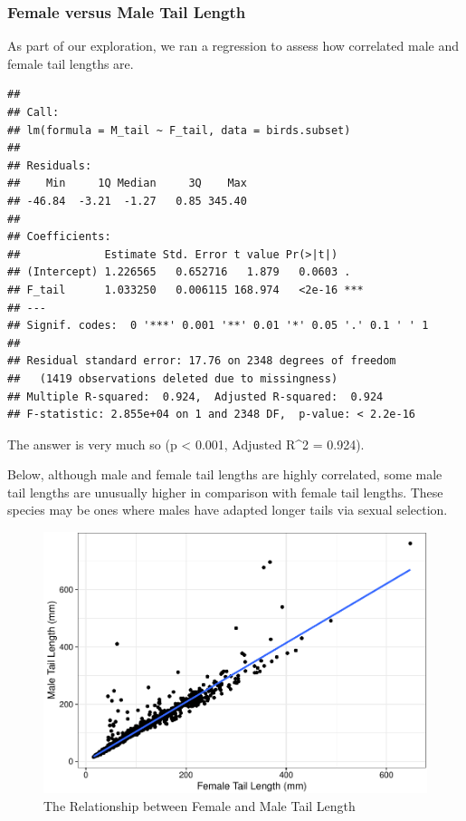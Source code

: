 \documentclass[
  12pt,
]{article}
\begin{document}
\newpage

\hypertarget{female-versus-male-tail-length}{%
\subsubsection{Female versus Male Tail
Length}\label{female-versus-male-tail-length}}

As part of our exploration, we ran a regression to assess how correlated
male and female tail lengths are.

\begin{verbatim}
## 
## Call:
## lm(formula = M_tail ~ F_tail, data = birds.subset)
## 
## Residuals:
##    Min     1Q Median     3Q    Max 
## -46.84  -3.21  -1.27   0.85 345.40 
## 
## Coefficients:
##             Estimate Std. Error t value Pr(>|t|)    
## (Intercept) 1.226565   0.652716   1.879   0.0603 .  
## F_tail      1.033250   0.006115 168.974   <2e-16 ***
## ---
## Signif. codes:  0 '***' 0.001 '**' 0.01 '*' 0.05 '.' 0.1 ' ' 1
## 
## Residual standard error: 17.76 on 2348 degrees of freedom
##   (1419 observations deleted due to missingness)
## Multiple R-squared:  0.924,  Adjusted R-squared:  0.924 
## F-statistic: 2.855e+04 on 1 and 2348 DF,  p-value: < 2.2e-16
\end{verbatim}

The answer is very much so (p \textless{} 0.001, Adjusted R\^{}2 =
0.924).

\newpage

Below, although male and female tail lengths are highly correlated, some
male tail lengths are unusually higher in comparison with female tail
lengths. These species may be ones where males have adapted longer tails
via sexual selection.

\begin{figure}
\centering
\includegraphics{Project_Code_files/figure-latex/r exploratory_plots_3-1.pdf}
\caption{The Relationship between Female and Male Tail Length}
\end{figure}
\end{document}
